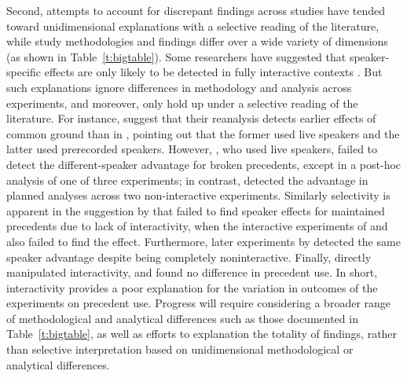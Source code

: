 \documentclass[doc,fignum,apacite,floatsintext]{apa6}
\begin{document}
Second, attempts to account for discrepant findings across studies have tended toward unidimensional explanations with a selective reading of the literature, while study methodologies and findings differ over a wide variety of dimensions (as shown in Table~\ref{t:bigtable}).  Some researchers have suggested that speaker-specific effects are only likely to be detected in fully interactive contexts \cite{brennanhanna09,brownschmidt09,brownschmidthanna11}.  But such explanations ignore differences in methodology and analysis across experiments, and moreover, only hold up under a selective reading of the literature.  For instance,  suggest that their reanalysis detects earlier effects of common ground than in , pointing out that the former used live speakers and the latter used prerecorded speakers.  However, , who used live speakers, failed to detect the different-speaker advantage for broken precedents, except in a post-hoc analysis of one of three experiments; in contrast,  detected the advantage in planned analyses across two non-interactive experiments.  Similarly selectivity is apparent in the suggestion by  that  failed to find speaker effects for maintained precedents due to lack of interactivity, when the interactive experiments of  and  also failed to find the effect.  Furthermore, later experiments by  detected the same speaker advantage despite being completely noninteractive.  Finally,  directly manipulated interactivity, and found no difference in precedent use.  In short, interactivity provides a poor explanation for the variation in outcomes of the experiments on precedent use.  Progress will require considering a broader range of methodological and analytical differences such as those documented in Table~\ref{t:bigtable}, as well as efforts to explanation the totality of findings, rather than selective interpretation based on unidimensional methodological or analytical differences.



\end{document}
